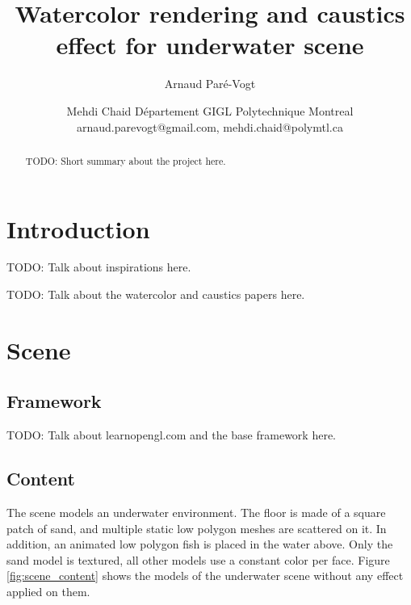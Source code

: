 \documentclass{article}
\title{Watercolor rendering and caustics effect for underwater scene} %
\author{
Arnaud Paré-Vogt
\and
Mehdi Chaid
\affiliations
Département GIGL Polytechnique Montreal\\
\emails
arnaud.parevogt@gmail.com, %
mehdi.chaid@polymtl.ca
}
\begin{document}
\maketitle

\begin{abstract}
TODO: Short summary about the project here.
\end{abstract}

\section{Introduction}

TODO: Talk about inspirations here. \medskip \par 

\noindent
TODO: Talk about the watercolor and caustics papers here.


\newpage
\section{Scene}

\subsection{Framework}

TODO: Talk about learnopengl.com and the base framework here.

\subsection{Content}
The scene models an underwater environment. The floor is made of a square patch of sand, and multiple static low polygon meshes are scattered on it. In addition, an animated low polygon fish is placed in the water above. Only the sand model is textured, all other models use a constant color per face. Figure \ref{fig:scene_content} shows the models of the underwater scene without any effect applied on them.
\end{document}
